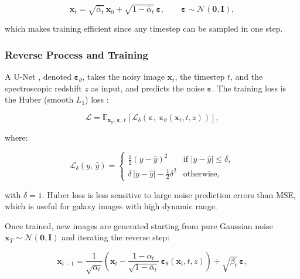 \documentclass[fleqn,usenatbib]{mnras}
\begin{document}
\begin{equation}
    \mathbf{x}_t =
        \sqrt{\bar{\alpha}_t}\,\mathbf{x}_0
        + \sqrt{1 - \bar{\alpha}_t}\,\boldsymbol{\varepsilon},
        \qquad \boldsymbol{\varepsilon} \sim \mathcal{N}(\mathbf{0}, \mathbf{I}),
    \label{eq:forward_closed}
\end{equation}

which makes training efficient since any timestep can be sampled in
one step.

\subsubsection{Reverse Process and Training}

A U-Net \citep{ronneberger2015}, denoted $\boldsymbol{\varepsilon}_\theta$,
takes the noisy image $\mathbf{x}_t$, the timestep $t$, and the
spectroscopic redshift $z$ as input, and predicts the noise
$\boldsymbol{\varepsilon}$.
The training loss is the Huber (smooth $L_1$) loss
\citep{huber1964}:

\begin{equation}
    \mathcal{L} =
    \mathbb{E}_{\mathbf{x}_0,\,\boldsymbol{\varepsilon},\,t}
    \!\left[
        \mathcal{L}_{\delta}\!\left(
            \boldsymbol{\varepsilon},\;
            \boldsymbol{\varepsilon}_\theta(\mathbf{x}_t, t, z)
        \right)
    \right],
    \label{eq:loss}
\end{equation}

where:

\begin{equation}
    \mathcal{L}_{\delta}(y,\,\hat{y}) =
    \begin{cases}
        \tfrac{1}{2}(y - \hat{y})^2
            & \text{if } |y - \hat{y}| \leq \delta, \\[4pt]
        \delta\,|y - \hat{y}| - \tfrac{1}{2}\delta^2
            & \text{otherwise,}
    \end{cases}
    \label{eq:huber}
\end{equation}

with $\delta = 1$.
Huber loss is less sensitive to large noise prediction errors than
MSE, which is useful for galaxy images with high dynamic range.

Once trained, new images are generated starting from pure Gaussian
noise $\mathbf{x}_T \sim \mathcal{N}(\mathbf{0}, \mathbf{I})$ and
iterating the reverse step:

\begin{equation}
    \mathbf{x}_{t-1} =
        \frac{1}{\sqrt{\alpha_t}}
        \!\left(
            \mathbf{x}_t -
            \frac{1 - \alpha_t}{\sqrt{1 - \bar{\alpha}_t}}
            \,\boldsymbol{\varepsilon}_\theta(\mathbf{x}_t, t, z)
        \right)
        + \sqrt{\beta_t}\,\boldsymbol{\varepsilon},
    \label{eq:reverse}
\end{equation}
\end{document}
